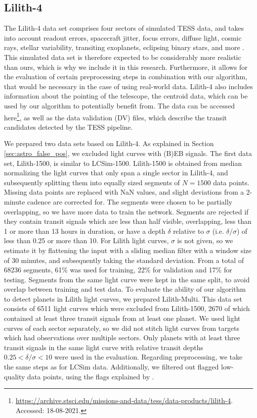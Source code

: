 \subsection{Lilith-4}
\label{sec:lilith-4}

The Lilith-4 data set comprises four sectors of simulated TESS data, and takes into account readout errors, spacecraft jitter, focus errors, diffuse light, cosmic rays, stellar variability, transiting exoplanets, eclipsing binary stars, and more \citep{smith2019four}. This simulated data set is therefore expected to be considerably more realistic than ours, which is why we include it in this research.  Furthermore, it allows for the evaluation of certain preprocessing steps in combination with our algorithm, that would be necessary in the case of using real-world data. Lilith-4 also includes information about the pointing of the telescope, the centroid data, which can be used by our algorithm to potentially benefit from. The data can be accessed here\footnote{\url{https://archive.stsci.edu/missions-and-data/tess/data-products/lilith-4}. Accessed: 18-08-2021.}, as well as the data validation (DV) files, which describe the transit candidates detected by the TESS pipeline.

We prepared two data sets based on Lilith-4. As explained in Section \ref{sec:astro_false_pos}, we excluded light curves with (B)EB signals. The first data set, Lilith-1500, is similar to LCSim-1500. Lilith-1500 is obtained from median normalizing the light curves that only span a single sector in Lilith-4, and subsequently splitting them into equally sized segments of $N=1500$ data points. Missing data points are replaced with NaN values, and slight deviations from a 2-minute cadence are corrected for. The segments were chosen to be partially overlapping, so we have more data to train the network. Segments are rejected if they contain transit signals which are less than half visible, overlapping, less than 1 or more than 13 hours in duration, or have a depth $\delta$ relative to $\sigma$ (i.e. $\delta/\sigma$) of less than 0.25 or more than 10. For Lilith light curves, $\sigma$  is not given, so we estimate it by flattening the input with a sliding median filter with a window size of 30 minutes, and subsequently taking the standard deviation. From a total of 68236 segments, 61\% was used for training, 22\% for validation and 17\% for testing. Segments from the same light curve were kept in the same split, to avoid overlap between training and test data. To evaluate the ability of our algorithm to detect planets in Lilith light curves, we prepared Lilith-Multi. This data set consists of 6511 light curves which were excluded from Lilith-1500, 2670 of which contained at least three transit signals from at least one planet. We used light curves of each sector separately, so we did not stitch light curves from targets which had observations over multiple sectors. Only planets with at least three transit signals in the same light curve with relative transit depths $0.25 < \delta/\sigma < 10$ were used in the evaluation. Regarding preprocessing, we take the same steps as for LCSim data. Additionally, we filtered out flagged low-quality data points, using the flags explained by \cite{tenenbaum2018tess}.


